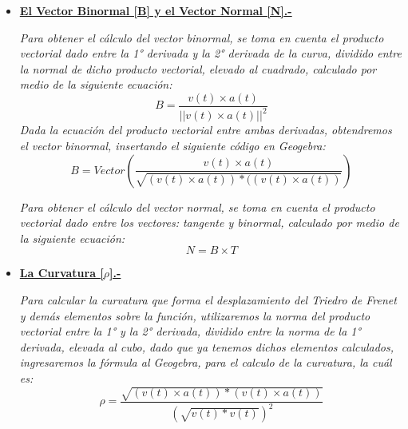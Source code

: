 \documentclass[letterpaper, 11pt]{extarticle}
\begin{document}
\begin{itemize}
    \item{\textbf{\underline{\normalsize{El Vector Binormal [B] y el Vector Normal [N].-}}}}
        \begin{center}
            \textit{Para obtener el cálculo del vector binormal, se toma en cuenta el producto vectorial dado entre la 1° derivada y la 2° derivada de la curva, dividido entre la normal de dicho producto vectorial, elevado al cuadrado, calculado por medio de la siguiente ecuación:}
            \begin{equation}
                B=\frac{v(t) \times a(t)}{\left||v(t) \times a(t)\right||^2}
            \end{equation}
            \textit{Dada la ecuación del producto vectorial entre ambas derivadas, obtendremos el vector binormal, insertando el siguiente código en Geogebra:}
                \begin{equation}
                   B = Vector(\frac{v(t) \times a(t)}{\sqrt{(v(t) \times a(t)) * ((v(t) \times a(t))}})
                \end{equation}
    \end{center}
        \begin{center}
            \textit{Para obtener el cálculo del vector normal, se toma en cuenta el producto vectorial dado entre los vectores: tangente y binormal, calculado por medio de la siguiente ecuación:}
            \begin{equation}
                N = B \times T
            \end{equation}
        \end{center}
    \bigskip

    \item{\textbf{\underline{\normalsize{La Curvatura [$\rho$].-}}}}
        \begin{center}
            \textit{Para calcular la curvatura que forma el desplazamiento del Triedro de Frenet y demás elementos sobre la función, utilizaremos la norma del producto vectorial entre la 1° y la 2° derivada, dividido entre la norma de la 1° derivada, elevada al cubo, dado que ya tenemos dichos elementos calculados, ingresaremos la fórmula al Geogebra, para el calculo de la curvatura, la cuál es:}
            \begin{equation}
                \rho = \frac{\sqrt{(v(t) \times a(t)) * (v(t) \times a(t))}}{(\sqrt{v(t) * v(t)})^{2}}
            \end{equation}
        \end{center}
    \bigskip


\end{itemize}
\end{document}
